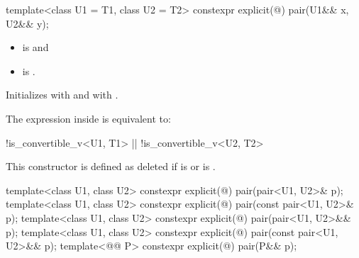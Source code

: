 %
\begin{itemdecl}
template<class U1 = T1, class U2 = T2> constexpr explicit(@\seebelow@) pair(U1&& x, U2&& y);
\end{itemdecl}

\begin{itemdescr}
\pnum
\constraints
\begin{itemize}
\item {} is  and
\item {} is .
\end{itemize}

\pnum
\effects
Initializes  with
 and 
with .

\pnum
\remarks
The expression inside  is equivalent to:
\begin{codeblock}
!is_convertible_v<U1, T1> || !is_convertible_v<U2, T2>
\end{codeblock}
This constructor is defined as deleted if
is  or
is .
\end{itemdescr}

%
\begin{itemdecl}
template<class U1, class U2> constexpr explicit(@\seebelow@) pair(pair<U1, U2>& p);
template<class U1, class U2> constexpr explicit(@\seebelow@) pair(const pair<U1, U2>& p);
template<class U1, class U2> constexpr explicit(@\seebelow@) pair(pair<U1, U2>&& p);
template<class U1, class U2> constexpr explicit(@\seebelow@) pair(const pair<U1, U2>&& p);
template<@@ P> constexpr explicit(@\seebelow@) pair(P&& p);
\end{itemdecl}

